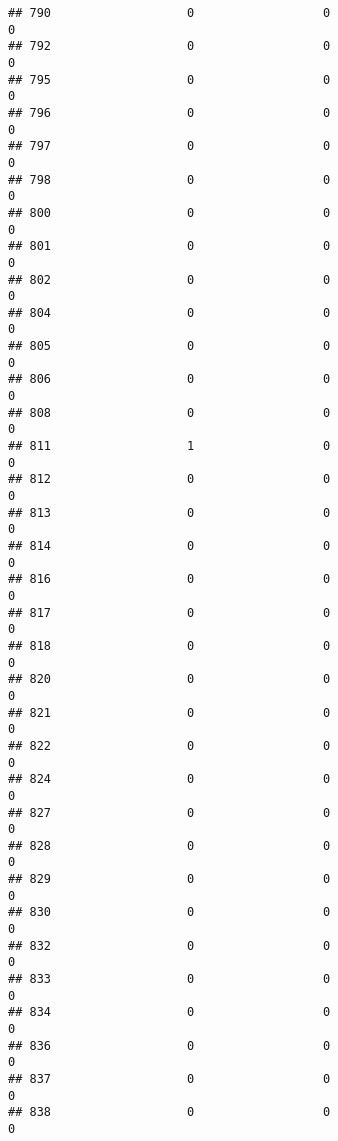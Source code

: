 \documentclass[
]{article}
\begin{document}
\begin{verbatim}
## 790                   0                  0                              0
## 792                   0                  0                              0
## 795                   0                  0                              0
## 796                   0                  0                              0
## 797                   0                  0                              0
## 798                   0                  0                              0
## 800                   0                  0                              0
## 801                   0                  0                              0
## 802                   0                  0                              0
## 804                   0                  0                              0
## 805                   0                  0                              0
## 806                   0                  0                              0
## 808                   0                  0                              0
## 811                   1                  0                              0
## 812                   0                  0                              0
## 813                   0                  0                              0
## 814                   0                  0                              0
## 816                   0                  0                              0
## 817                   0                  0                              0
## 818                   0                  0                              0
## 820                   0                  0                              0
## 821                   0                  0                              0
## 822                   0                  0                              0
## 824                   0                  0                              0
## 827                   0                  0                              0
## 828                   0                  0                              0
## 829                   0                  0                              0
## 830                   0                  0                              0
## 832                   0                  0                              0
## 833                   0                  0                              0
## 834                   0                  0                              0
## 836                   0                  0                              0
## 837                   0                  0                              0
## 838                   0                  0                              0

\end{verbatim}
\end{document}
